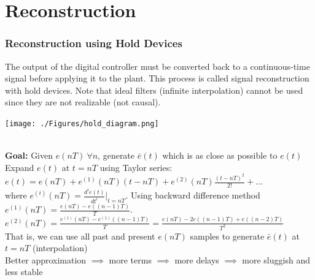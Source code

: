 \documentclass[mathserif, 10pt]{beamer} %
\begin{document}
\section{Reconstruction}
\frame
{

\small

\frametitle{Reconstruction using Hold Devices}
The output of the digital controller must be converted back to a continuous-time signal before applying it to the plant. This
process is called signal reconstruction with hold devices. Note that ideal filters (infinite interpolation) cannot be used since
they are not realizable (not causal).
\begin{center}
\texttt{[image: ./Figures/hold\_diagram.png]}
\end{center} \\
\textbf{Goal:}  Given $e(nT)~\forall n$, generate $\bar e(t)$ which is as close as possible to $e(t)$\\ \vspace{.1in}
Expand $e(t)$ at $t=nT$ using Taylor series:\\
$e(t) = e(nT) + e^{(1)}(nT)(t-nT) + e^{(2)}(nT)\frac{(t-nT)^2}{2!}+\hdots$\\
where $e^{(i)}(nT) = \frac{d^i e(t)}{dt^i}|_{t=nT}$. Using backward difference method \\ %

$e^{(1)}(nT) = \frac{e(nT) -e((n-1)T)}{T}$. \\
$e^{(2)}(nT) = \frac{e^{(1)}(nT)-e^{(1)}((n-1)T)}{T} = \frac{e(nT) -2e((n-1)T) +e((n-2)T)}{T^2}$\\ \vspace{.1in}
That is, we can use all past and present $e(nT)$ samples to generate $\bar e(t)$ at $t=nT$ (interpolation)\\ \vspace{.1in}
Better approximation $\implies$ more terms $\implies$ more delays $\implies$ more sluggish and less stable



}
\frame
\end{document}
